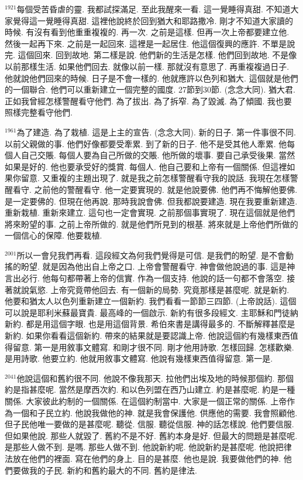 \documentclass{book}
\begin{document}
$^{1921}$每個受苦昏虐的靈.
我都試探滿足.
至此我醒來一看.
這一覺睡得真甜.
不知道大家覺得這一覺睡得真甜.
這裡他說終於回到猶大和耶路撒冷.
剛才不知道大家讀的時候.
有沒有看到他重重複複的.
再一次.
之前是這樣.
但再一次上帝都要建立他.
然後一起再下來.
之前是一起回來.
這裡是一起居住.
他這個復興的應許.
不單是說完.
這個回來.
回到故地.
第二樣是說.
他們新的生活是怎樣.
他們回到故地.
不是像以前那樣生活.
如果他們回去.
就像以前一樣.
那就沒有意思了.
再重複複過日子.
他就說他們回來的時候.
日子是不會一樣的.
他就應許以色列和猶大.
這個就是他們的一個聯合.
他們可以重新建立一個完整的國度.
27節到30節.
(念念大同).
猶大君.
正如我曾經怎樣警醒看守他們.
為了拔出.
為了拆窄.
為了毀滅.
為了傾國.
我也要照樣完整看守他們.

$^{1961}$為了建造.
為了栽植.
這是上主的宣告.
(念念大同).
新的日子.
第一件事很不同.
以前父親做的事.
他們好像都要受牽累.
到了新的日子.
他不是受其他人牽累.
他每個人自己交賬.
每個人要為自己所做的交賬.
他所做的壞事.
要自己承受後果.
當然如果是好的.
他也要承受好的獎賞.
每個人.
他自己要和上帝有一個關係.
但這裡如果你留意.
又重複的主題出現了.
就是我之前怎樣警醒看守我的說話.
我現在怎樣警醒看守.
之前他的警醒看守.
他一定要實現的.
就是他說要佛.
他們再不悔解他要佛.
是一定要佛的.
但現在他再說.
那時我說會佛.
但我都說要建造.
現在我要重新建造.
重新栽植.
重新來建立.
這句也一定會實現.
之前那個事實現了.
現在這個就是他們將來盼望的事.
之前上帝所做的.
就是他們所見到的根基.
將來就是上帝他們所做的一個信心的保障.
他要栽植.

$^{2001}$所以一會兒我們再看.
這段經文為何我們覺得是可信.
是我們的盼望.
是不會動搖的盼望.
就是因為他出自上帝之口.
上帝會警醒看守.
神會做他說過的事.
這是神言出必行.
他每句都帶著上帝的信實.
作為一個支持.
他說的話一句都不會落空.
接著就說氣慾.
上帝究竟帶他回去.
有一個新的局勢.
究竟那樣是甚麼呢.
就是新約.
他要和猶太人以色列重新建立一個新約.
我們看看一節節三四節.
(上帝說話).
這個可以說是耶利米蘇最寶貴.
最高峰的一個啟示.
新約有很多段經文.
主耶穌和門徒納新約.
都是用這個字眼.
也是用這個背景.
希伯來書是講得最多的.
不斷解釋甚麼是新約.
如果你看看這個新約.
帶來的結果就是要認識上帝.
他說這個約有幾樣東西值得留意.
第一是用敘事文體寫.
和剛才很不同.
剛才他用詩歌.
怎樣回歸.
怎樣歡樂.
是用詩歌.
他要立約.
他就用敘事文體寫.
他說有幾樣東西值得留意.
第一是.

$^{2041}$他說這個和舊約很不同.
他說不像我那天.
拉他們出埃及地的時候那個約.
那個約是指甚麼呢.
當然是摩西次約.
和以色列盟在西乃山建立.
約是甚麼呢.
約是一種關係.
大家彼此約制的一個關係.
在這個約制當中.
大家是一個正常的關係.
上帝作為一個和子民立約.
他說我做他的神.
就是我會保護他.
供應他的需要.
我會照顧他.
但子民他唯一要做的是甚麼呢.
聽從.
信服.
聽從信服.
神的話怎樣說.
他們要信服.
但如果他說.
那些人就毀了.
舊約不是不好.
舊約本身是好.
但最大的問題是甚麼呢.
是那些人做不到.
是嗎.
那些人做不到.
他說新約呢.
他說新約是甚麼呢.
他說把律法放在他們的裡面.
寫在他們的身上.
目的是甚麼.
他也是說.
我要做他們的神.
他們要做我的子民.
新約和舊約最大的不同.
舊約是律法.
\end{document}
